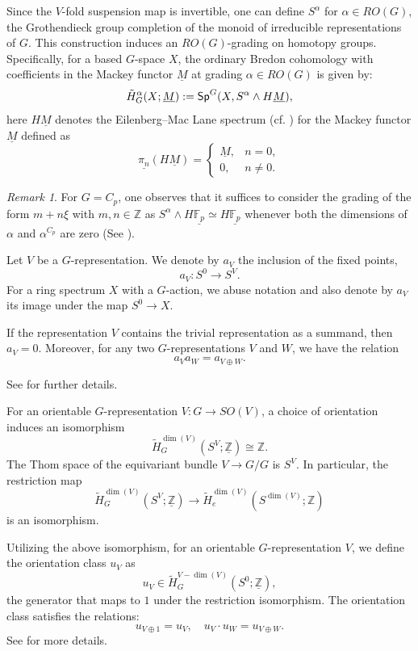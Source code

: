 \documentclass[a4paper,leqno,11pt]{amsart}
\newcommand{\uM}{\underline{M}}
\newcommand{\Z}{\mathbb Z}
\newcommand{\bF}{\mathbb{F}}
\newcommand{\bFp}{\bF_p}
\newcommand{\uFp}{\underline{\bFp}}
\newcommand{\uZ}{\underline{\mathbb{Z}}}
\newcommand{\Sp}{\sf{Sp}}
\theoremstyle{plain}
\theoremstyle{definition}
\theoremstyle{remark}
\newtheorem{remark}[theorem]{Remark}
\begin{document}
Since the $V$-fold suspension map is invertible, one can define $S^\alpha$ for $\alpha \in RO(G)$, the Grothendieck group completion of the monoid of irreducible representations of $G$. This construction induces an $RO(G)$-grading on homotopy groups. Specifically, for a based $G$-space $X$, the ordinary Bredon cohomology with coefficients in the Mackey functor $\uM$ at grading $\alpha \in RO(G)$ is given by:  
\[
\tilde{H}^\alpha_G(X; \uM) := {\Sp}^G(X, S^\alpha \wedge H\uM),
\]
here $H\uM$ denotes the  Eilenberg--Mac Lane spectrum (cf. \cite{HHR16}) for the  Mackey functor $\uM$ defined as  
\[
\underline{\pi_n}(H\uM) = 
\begin{cases} 
\uM, & n = 0, \\
0, & n \neq 0.
\end{cases}
\]

\begin{remark}\label{cpgrad}
   For $G=C_p$, one observes that it suffices to consider the grading of the form $m+n \xi$ with $m,n \in \Z$ as $S^\alpha \wedge H\uFp \simeq H\uFp$ whenever both the dimensions of $\alpha$ and $\alpha^{C_p}$ are zero (See \cite[Appendix B]{FL04}). 
\end{remark}

Let $V$ be a $G$-representation. We denote by $a_V$ the inclusion of the fixed points,  
\[
a_V: S^0 \to S^V.
\]
For a ring spectrum $X$ with a $G$-action, we abuse notation and also denote by $a_V$ its image under the map $S^0 \to X$.

If the representation $V$ contains the trivial representation as a summand, then $a_V = 0$.  
Moreover, for any two $G$-representations $V$ and $W$, we have the relation  
\[
a_V a_W = a_{V \oplus W}.
\]

\noindent See \cite[Definition 3.11]{HHR16} for further details.



For an orientable $G$-representation $V: G \to SO(V)$, a choice of orientation induces an isomorphism  
\[
\tilde{H}^{\dim(V)}_G(S^V; \uZ) \cong \Z.
\]
The Thom space of the equivariant bundle $V \to G/G$ is $S^V$. In particular, the restriction map  
\[
\tilde{H}^{\dim(V)}_G(S^V; \uZ) \to \tilde{H}^{\dim(V)}_e(S^{\dim(V)}; \Z)
\]
is an isomorphism.

Utilizing the above isomorphism, for an orientable $G$-representation $V$, we define the orientation class $u_V$ as  
\[
u_V \in \tilde{H}^{V-\dim(V)}_G(S^0 ; \uZ),
\]
the generator that maps to $1$ under the restriction isomorphism. The orientation class satisfies the relations:  
\[
u_{V \oplus 1} = u_V, \quad u_V \cdot u_W = u_{V \oplus W}.
\]
\noindent See \cite[Definition 3.12]{HHR16} for more details.
  
\end{document}
